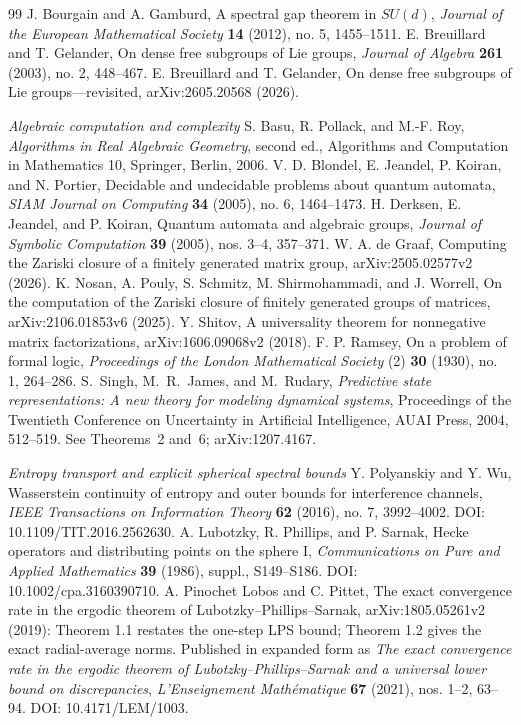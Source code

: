 \begin{thebibliography}{99}
 J. Bourgain and A. Gamburd, A spectral gap theorem in $SU(d)$, \emph{Journal of the European Mathematical Society} \textbf{14} (2012), no. 5, 1455--1511.
 E. Breuillard and T. Gelander, On dense free subgroups of Lie groups, \emph{Journal of Algebra} \textbf{261} (2003), no. 2, 448--467.
 E. Breuillard and T. Gelander, On dense free subgroups of Lie groups---revisited, arXiv:2605.20568 (2026).
\item[]\textit{Algebraic computation and complexity}
 S. Basu, R. Pollack, and M.-F. Roy, \emph{Algorithms in Real Algebraic Geometry}, second ed., Algorithms and Computation in Mathematics 10, Springer, Berlin, 2006.
 V. D. Blondel, E. Jeandel, P. Koiran, and N. Portier, Decidable and undecidable problems about quantum automata, \emph{SIAM Journal on Computing} \textbf{34} (2005), no. 6, 1464--1473.
 H. Derksen, E. Jeandel, and P. Koiran, Quantum automata and algebraic groups, \emph{Journal of Symbolic Computation} \textbf{39} (2005), nos. 3--4, 357--371.
 W. A. de Graaf, Computing the Zariski closure of a finitely generated matrix group, arXiv:2505.02577v2 (2026).
 K. Nosan, A. Pouly, S. Schmitz, M. Shirmohammadi, and J. Worrell, On the computation of the Zariski closure of finitely generated groups of matrices, arXiv:2106.01853v6 (2025).
 Y. Shitov, A universality theorem for nonnegative matrix factorizations, arXiv:1606.09068v2 (2018).
 F. P. Ramsey, On a problem of formal logic, \emph{Proceedings of the London Mathematical Society} (2) \textbf{30} (1930), no. 1, 264--286.
S.~Singh, M.~R.~James, and M.~Rudary,
\emph{Predictive state representations: A new theory for modeling dynamical systems},
Proceedings of the Twentieth Conference on Uncertainty in Artificial Intelligence,
AUAI Press, 2004, 512--519. See Theorems~2 and~6; arXiv:1207.4167.
\item[]\textit{Entropy transport and explicit spherical spectral bounds}
 Y. Polyanskiy and Y. Wu, Wasserstein continuity of entropy and outer bounds for interference channels, \emph{IEEE Transactions on Information Theory} \textbf{62} (2016), no. 7, 3992--4002. DOI: 10.1109/TIT.2016.2562630.
 A. Lubotzky, R. Phillips, and P. Sarnak, Hecke operators and distributing points on the sphere I, \emph{Communications on Pure and Applied Mathematics} \textbf{39} (1986), suppl., S149--S186. DOI: 10.1002/cpa.3160390710.
 A. Pinochet Lobos and C. Pittet, The exact convergence rate in the ergodic theorem of Lubotzky--Phillips--Sarnak, arXiv:1805.05261v2 (2019): Theorem 1.1 restates the one-step LPS bound; Theorem 1.2 gives the exact radial-average norms. Published in expanded form as \emph{The exact convergence rate in the ergodic theorem of Lubotzky--Phillips--Sarnak and a universal lower bound on discrepancies}, \emph{L'Enseignement Math\'ematique} \textbf{67} (2021), nos. 1--2, 63--94. DOI: 10.4171/LEM/1003.

\end{thebibliography}
